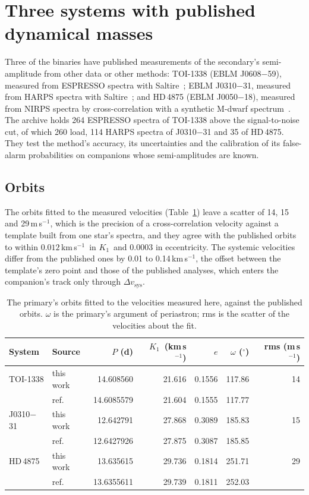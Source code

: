 \documentclass[3p,11pt]{elsarticle}
\newcommand{\kms}{km\,s$^{-1}$}
\newcommand{\Kone}{$K_1$}
\newcommand{\dvsys}{$\Delta v_\mathrm{sys}$}
\begin{document}
\section{Three systems with published dynamical masses}\label{sec:validation}

Three of the binaries have published measurements of the secondary's semi-amplitude from other
data or other methods: TOI-1338 (EBLM J0608$-$59), measured from ESPRESSO spectra with
Saltire~\cite{Sebastian2024b}; EBLM J0310$-$31, measured from HARPS spectra with
Saltire~\cite{Stevenson2026}; and HD\,4875 (EBLM J0050$-$18), measured from NIRPS spectra by
cross-correlation with a synthetic M-dwarf spectrum~\cite{Hahlin2026}. The archive holds 264
ESPRESSO spectra of TOI-1338 above the signal-to-noise cut, of which 260 load, 114 HARPS spectra of
J0310$-$31 and 35 of HD\,4875. They test the method's accuracy, its uncertainties and the
calibration of its false-alarm probabilities on companions whose semi-amplitudes are known.

\subsection{Orbits}

The orbits fitted to the measured velocities (Table~\ref{tab:orbits}) leave a scatter of 14, 15
and 29\,m\,s$^{-1}$, which is the precision of a cross-correlation velocity against a template
built from one star's spectra, and they agree with the published orbits to within
$0.012$\,\kms\ in \Kone\ and $0.0003$ in eccentricity. The systemic velocities differ from the
published ones by 0.01 to 0.14\,\kms, the offset between the template's zero point and those of the
published analyses, which enters the companion's track only through \dvsys.

\begin{table}[t]
\centering
\caption{The primary's orbits fitted to the velocities measured here, against the published orbits.
$\omega$ is the primary's argument of periastron; rms is the scatter of the velocities about the
fit.}\label{tab:orbits}
\begin{tabular}{llrrrrr}
\toprule
System & Source & $P$ (d) & \Kone\ (\kms) & $e$ & $\omega$ ($^\circ$) & rms (m\,s$^{-1}$)\\
\midrule
TOI-1338  & this work & 14.608560 & 21.616 & 0.1556 & 117.86 & 14\\
          & ref.~\cite{Sebastian2024b} & 14.6085579 & 21.604 & 0.1555 & 117.77 & \\
J0310$-$31 & this work & 12.642791 & 27.868 & 0.3089 & 185.83 & 15\\
          & ref.~\cite{Stevenson2026} & 12.6427926 & 27.875 & 0.3087 & 185.85 & \\
HD\,4875  & this work & 13.635615 & 29.736 & 0.1814 & 251.71 & 29\\
          & ref.~\cite{Hahlin2026} & 13.6355611 & 29.739 & 0.1811 & 252.03 & \\
\bottomrule
\end{tabular}
\end{table}
\end{document}
